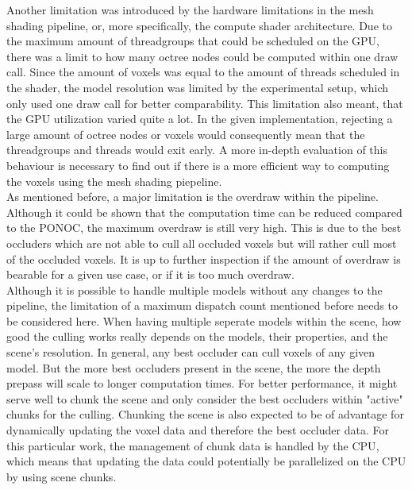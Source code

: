 \noindent
Another limitation was introduced by the hardware limitations in the mesh shading pipeline, or, more specifically, the 
compute shader architecture. Due to the maximum amount of threadgroups that could be scheduled on the \ac{GPU}, there 
was a limit to how many octree nodes could be computed within one draw call. Since the amount of voxels was equal to the 
amount of threads scheduled in the shader, the model resolution was limited by the experimental setup, which only used 
one draw call for better comparability. This limitation also meant, that the \ac{GPU} utilization varied quite a lot. 
In the given implementation, rejecting a large amount of octree nodes or voxels would consequently mean that the 
threadgroups and threads would exit early. A more in-depth evaluation of this behaviour is necessary to find out if 
there is a more efficient way to computing the voxels using the mesh shading piepeline. \\

\noindent
As mentioned before, a major limitation is the overdraw within the pipeline. Although it could be shown that the 
computation time can be reduced compared to the \ac{PONOC}, the maximum overdraw is still 
very high. This is due to the best occluders which are not able to cull all occluded voxels but will rather cull 
most of the occluded voxels. It is up to further inspection if the amount of overdraw is bearable for a given use 
case, or if it is too much overdraw. \\

\noindent
Although it is possible to handle multiple models without any changes to the pipeline, the limitation of a maximum 
dispatch count mentioned before needs to be considered here. When having multiple seperate models within the scene, 
how good the culling works really depends on the models, their properties, and the scene's resolution. In general, 
any best occluder can cull voxels of any given model. But the more best occluders present in the scene, the more 
the depth prepass will scale to longer computation times. For better performance, it might serve well to chunk the 
scene and only consider the best occluders within "active" chunks for the culling. Chunking the scene is also 
expected to be of advantage for dynamically updating the voxel data and therefore the best occluder data. For this 
particular work, the management of chunk data is handled by the \ac{CPU}, which means that updating the data could 
potentially be parallelized on the \ac{CPU} by using scene chunks. \\
 